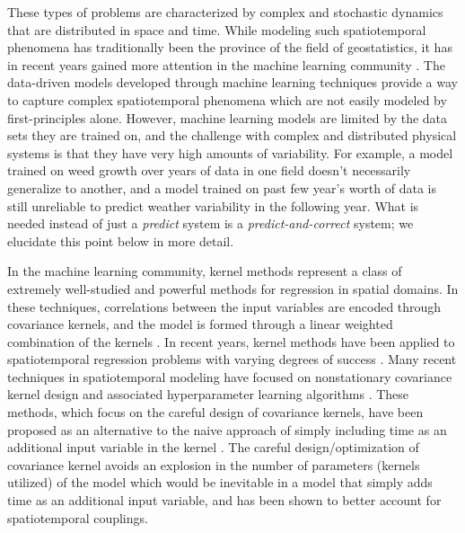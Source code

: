 These types of problems are characterized by complex and stochastic dynamics that are distributed in space and time. %
While modeling such spatiotemporal phenomena has traditionally been the province of the field of geostatistics, it has in recent years gained more attention in the machine learning community \cite{cressie2011statistics}. The data-driven models developed through machine learning techniques provide a way to capture complex spatiotemporal phenomena which are not easily modeled by first-principles alone. However, machine learning models are limited by the data sets they are trained on, and the challenge with complex and distributed physical systems is that they have very high amounts of variability. For example, a model trained on weed growth over years of data in one field doesn't necessarily generalize to another, and a model trained on past few year's worth of data is still unreliable to predict weather variability in the following year. What is needed instead of just a \textit{predict} system is a \textit{predict-and-correct} system; we elucidate this point below in more detail.



In the machine learning community, kernel methods represent a class of extremely well-studied and powerful methods for regression in spatial domains. In these techniques, correlations between the input variables are encoded through covariance kernels, and the model is formed through a linear weighted combination of the kernels \cite{RasmussenWilliams2005,schoelkopf01kernelbased,scholkopf2002learning}. In recent years, kernel methods have been applied to spatiotemporal regression problems with varying degrees of success \cite{cressie2011statistics,RasmussenWilliams2005}. Many recent techniques in spatiotemporal modeling have focused on nonstationary covariance kernel design and associated hyperparameter learning algorithms \cite{garg2012AAAI,ma2003nonstationary,plagemann2008nonstationary}. These methods, which focus on the careful design of covariance kernels,  have been proposed as an alternative to the naive approach of  simply including time as an additional input variable in the kernel \cite{Chowdhary13_CDC1}. The careful design/optimization of covariance kernel avoids an explosion in the number of parameters (kernels utilized) of the model which would be inevitable in a model that simply adds time as an additional input variable, and has been shown to better account for spatiotemporal couplings. 

